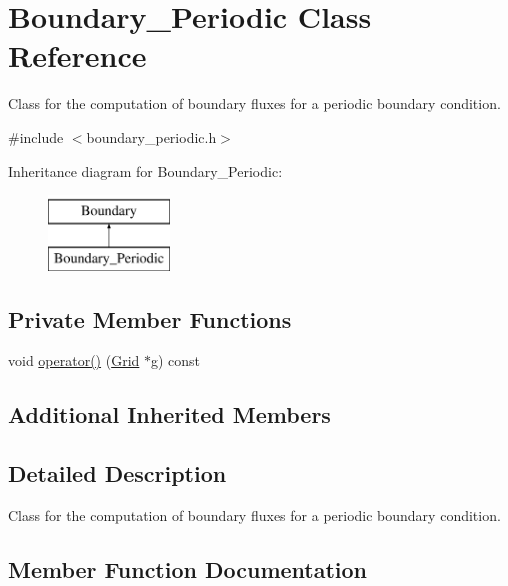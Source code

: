 \hypertarget{class_boundary___periodic}{}\section{Boundary\+\_\+\+Periodic Class Reference}
\label{class_boundary___periodic}


Class for the computation of boundary fluxes for a periodic boundary condition.  




{\ttfamily \#include $<$boundary\+\_\+periodic.\+h$>$}

Inheritance diagram for Boundary\+\_\+\+Periodic\+:\begin{figure}[H]
\begin{center}
\leavevmode
\includegraphics[height=2.000000cm]{class_boundary___periodic}
\end{center}
\end{figure}
\subsection*{Private Member Functions}
\begin{DoxyCompactItemize}
\item 
void \hyperlink{class_boundary___periodic_a72f5a45c04233e1c572098769f12fe82}{operator()} (\hyperlink{class_grid}{Grid} $\ast$g) const 
\end{DoxyCompactItemize}
\subsection*{Additional Inherited Members}


\subsection{Detailed Description}
Class for the computation of boundary fluxes for a periodic boundary condition. 

\subsection{Member Function Documentation}
